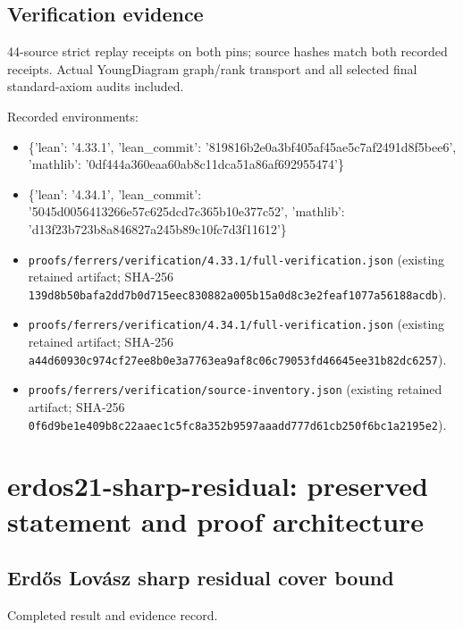 \documentclass[11pt,a4paper]{article}
\begin{document}
\subsection{Verification evidence}
44-source strict replay receipts on both pins; source hashes match both recorded receipts. Actual YoungDiagram graph/rank transport and all selected final standard-axiom audits included.

Recorded environments:

\begin{itemize}
\item \{'lean': '4.33.1', 'lean\_commit': '819816b2e0a3bf405af45ae5c7af2491d8f5bee6', 'mathlib': '0df444a360eaa60ab8c11dca51a86af692955474'\}
\end{itemize}
\begin{itemize}
\item \{'lean': '4.34.1', 'lean\_commit': '5045d0056413266e57c625dcd7c365b10e377c52', 'mathlib': 'd13f23b723b8a846827a245b89c10fc7d3f11612'\}
\end{itemize}
\begin{itemize}
\item \texttt{proofs/ferrers/verification/4.33.1/full-verification.json} (existing retained artifact; SHA-256 \texttt{139d8b50bafa2dd7b0d715eec830882a005b15a0d8c3e2feaf1077a56188acdb}).
\end{itemize}
\begin{itemize}
\item \texttt{proofs/ferrers/verification/4.34.1/full-verification.json} (existing retained artifact; SHA-256 \texttt{a44d60930c974cf27ee8b0e3a7763ea9af8c06c79053fd46645ee31b82dc6257}).
\end{itemize}
\begin{itemize}
\item \texttt{proofs/ferrers/verification/source-inventory.json} (existing retained artifact; SHA-256 \texttt{0f6d9be1e409b8c22aaec1c5fc8a352b9597aaadd777d61cb250f6bc1a2195e2}).
\end{itemize}
\clearpage
\section{erdos21-sharp-residual: preserved statement and proof architecture}
\subsection{Erdős Lovász sharp residual cover bound}
Completed result and evidence record.
\end{document}
